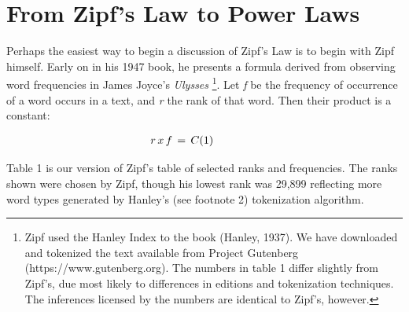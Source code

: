 \documentclass[12pt]{article}
\begin{document}
\section{From Zipf's Law to Power Laws}

\indent 
Perhaps the easiest way to begin a discussion of Zipf's Law is to begin with Zipf himself.  Early on in his 1947 book, he presents a formula derived from observing word frequencies in James Joyce's \emph{Ulysses} \footnote[2]{Zipf used the Hanley Index to the book (Hanley, 1937). We have downloaded and tokenized the text available from Project Gutenberg (https://www.gutenberg.org). The numbers in table 1 differ slightly from Zipf's, due most likely to differences in editions and tokenization techniques.  The inferences licensed by the numbers are identical to Zipf's, however.}.  Let \emph{f} be the frequency of occurrence of a word occurs in a text, and \emph{r} the rank of that word.  Then their product is a constant:

\setlength{\abovedisplayskip}{1pt}
\setlength{\belowdisplayskip}{1pt}
\begin{center}
\begin{equation*}
\begin{aligned}
r\, x\, f\, =\, C\hspace{4em (1)}
\end{aligned}
\end{equation*}
\end{center}

Table 1 is our version of Zipf's table of selected ranks and frequencies.  The ranks shown were chosen by Zipf, though his lowest rank was 29,899 reflecting more word types generated by Hanley's (see footnote 2) tokenization algorithm.  
\end{document}
